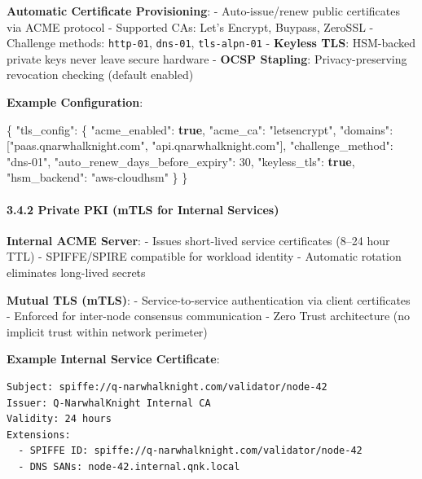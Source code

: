 \documentclass[
  11pt,
]{article}
\newenvironment{Shaded}{\begin{snugshade}}{\end{snugshade}}
\newcommand{\DataTypeTok}[1]{\textcolor[rgb]{0.13,0.29,0.53}{#1}}
\newcommand{\DecValTok}[1]{\textcolor[rgb]{0.00,0.00,0.81}{#1}}
\newcommand{\FunctionTok}[1]{\textcolor[rgb]{0.00,0.00,0.00}{#1}}
\newcommand{\KeywordTok}[1]{\textcolor[rgb]{0.13,0.29,0.53}{\textbf{#1}}}
\newcommand{\OtherTok}[1]{\textcolor[rgb]{0.56,0.35,0.01}{#1}}
\newcommand{\StringTok}[1]{\textcolor[rgb]{0.31,0.60,0.02}{#1}}
\begin{document}
\textbf{Automatic Certificate Provisioning}: - Auto-issue/renew public
certificates via ACME protocol - Supported CAs: Let's Encrypt, Buypass,
ZeroSSL - Challenge methods: \texttt{http-01}, \texttt{dns-01},
\texttt{tls-alpn-01} - \textbf{Keyless TLS}: HSM-backed private keys
never leave secure hardware - \textbf{OCSP Stapling}: Privacy-preserving
revocation checking (default enabled)

\textbf{Example Configuration}:

\begin{Shaded}
\begin{Highlighting}[]
\FunctionTok{\{}
  \DataTypeTok{"tls\_config"}\FunctionTok{:} \FunctionTok{\{}
    \DataTypeTok{"acme\_enabled"}\FunctionTok{:} \KeywordTok{true}\FunctionTok{,}
    \DataTypeTok{"acme\_ca"}\FunctionTok{:} \StringTok{"letsencrypt"}\FunctionTok{,}
    \DataTypeTok{"domains"}\FunctionTok{:} \OtherTok{[}\StringTok{"paas.qnarwhalknight.com"}\OtherTok{,} \StringTok{"api.qnarwhalknight.com"}\OtherTok{]}\FunctionTok{,}
    \DataTypeTok{"challenge\_method"}\FunctionTok{:} \StringTok{"dns{-}01"}\FunctionTok{,}
    \DataTypeTok{"auto\_renew\_days\_before\_expiry"}\FunctionTok{:} \DecValTok{30}\FunctionTok{,}
    \DataTypeTok{"keyless\_tls"}\FunctionTok{:} \KeywordTok{true}\FunctionTok{,}
    \DataTypeTok{"hsm\_backend"}\FunctionTok{:} \StringTok{"aws{-}cloudhsm"}
  \FunctionTok{\}}
\FunctionTok{\}}
\end{Highlighting}
\end{Shaded}

\hypertarget{private-pki-mtls-for-internal-services}{%
\paragraph{3.4.2 Private PKI (mTLS for Internal
Services)}\label{private-pki-mtls-for-internal-services}}

\textbf{Internal ACME Server}: - Issues short-lived service certificates
(8--24 hour TTL) - SPIFFE/SPIRE compatible for workload identity -
Automatic rotation eliminates long-lived secrets

\textbf{Mutual TLS (mTLS)}: - Service-to-service authentication via
client certificates - Enforced for inter-node consensus communication -
Zero Trust architecture (no implicit trust within network perimeter)

\textbf{Example Internal Service Certificate}:

\begin{verbatim}
Subject: spiffe://q-narwhalknight.com/validator/node-42
Issuer: Q-NarwhalKnight Internal CA
Validity: 24 hours
Extensions:
  - SPIFFE ID: spiffe://q-narwhalknight.com/validator/node-42
  - DNS SANs: node-42.internal.qnk.local
\end{verbatim}
\end{document}
